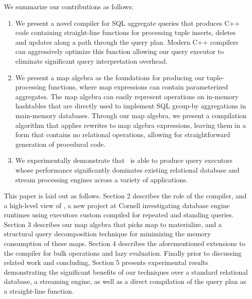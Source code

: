 We summarize our contributions as follows:

\begin{enumerate}
  \item We present a novel compiler for SQL aggregate queries
  that produces C++ code containing
  straight-line functions for processing tuple inserts, deletes and updates
  along a path through the query plan. Modern C++ compilers can aggressively
  optimize this function allowing our query executor to eliminate significant
  query interpretation overhead.
  \item We present a map algebra as the foundations for producing our
  tuple-processing functions, where map expressions can contain parameterized
  aggregates. The map algebra can easily represent operations on in-memory
  hashtables that are directly used to implement SQL group-by aggregations in
  main-memory data\-ba\-ses. Through our map algebra, we present a compilation
  algorithm that applies rewrites to map algebra expressions, leaving them in a
  form that contains no relational operations, allowing for straightforward
  generation of procedural code.
  \item We experimentally demonstrate that \compiler\ is able to produce
  query executors whose performance significantly dominates existing relational
  database and stream processing engines across a variety of applications. 
\end{enumerate}


This paper is laid out as follows. Section 2 describes the role of the compiler,
and a high-level view of \compiler, a new project at Cornell investigating
database engine runtimes using executors custom compiled for repeated and
standing queries.
Section 3 describes our map algebra that picks map to materialize, and a
structural query decomposition technique for minimizing the memory consumption of
these maps. Section 4 describes the aforementioned extensions to the compiler
for bulk operations and lazy evaluation. Finally prior to discussing
related work and concluding, Section 5 presents experimental results
demonstrating the significant benefits of our techniques over a standard
relational database, a streaming engine, as well as a direct compilation of the
query plan as a straight-line function.






